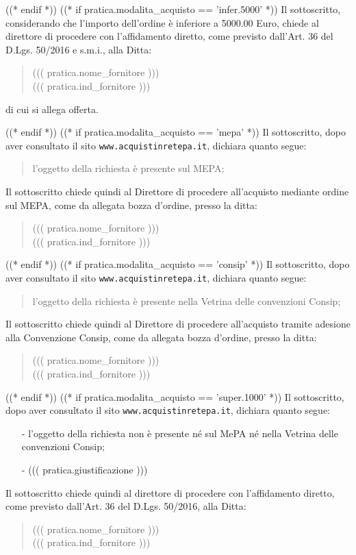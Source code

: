 \documentclass[a4paper,12pt]{letter}
\begin{document}
((* endif *))
((* if pratica.modalita_acquisto == 'infer.5000' *))
Il sottoscritto, considerando che l'importo dell'ordine
è inferiore a 5000.00 Euro,
chiede al direttore di procedere con l'affidamento diretto,
come previsto dall'Art. 36 del D.Lgs. 50/2016 e s.m.i., alla Ditta: 
\begin{quote}
((( pratica.nome_fornitore )))\\
((( pratica.ind_fornitore )))
\end{quote}

di cui si allega offerta.

((* endif *))
((* if pratica.modalita_acquisto == 'mepa' *))
Il sottoscritto, dopo aver consultato il sito {\tt www.acquistinretepa.it},
dichiara quanto segue:
\begin{quote}
l'oggetto della richiesta è presente sul MEPA;
\end{quote}

Il sottoscritto chiede quindi al Direttore di procedere all'acquisto mediante ordine sul MEPA,
come da allegata bozza d'ordine, presso la ditta:
\begin{quote}
((( pratica.nome_fornitore )))\\
((( pratica.ind_fornitore )))
\end{quote}
((* endif *))
((* if pratica.modalita_acquisto == 'consip' *))
Il sottoscritto, dopo aver consultato il sito {\tt www.acquistinretepa.it},
dichiara quanto segue:
\begin{quote}
l'oggetto della richiesta è presente nella Vetrina delle convenzioni Consip;
\end{quote}

Il sottoscritto chiede quindi al Direttore di procedere all'acquisto
tramite adesione alla Convenzione Consip, come da allegata bozza d'ordine,
presso la ditta:
\begin{quote}
((( pratica.nome_fornitore )))\\
((( pratica.ind_fornitore )))
\end{quote}
((* endif *))
((* if pratica.modalita_acquisto == 'super.1000' *)) 
Il sottoscritto, dopo aver consultato il sito {\tt www.acquistinretepa.it},
dichiara quanto segue:

\begin{itemize}
\item[-] l'oggetto della richiesta non è presente n\'e sul MePA n\'e nella Vetrina delle convenzioni Consip;
\item[-] ((( pratica.giustificazione )))
\end{itemize}
Il sottoscritto chiede quindi al direttore di procedere con l'affidamento diretto,
come previsto dall'Art. 36 del D.Lgs. 50/2016, alla Ditta: 
\begin{quote}
((( pratica.nome_fornitore )))\\
((( pratica.ind_fornitore )))
\end{quote}
\end{document}
